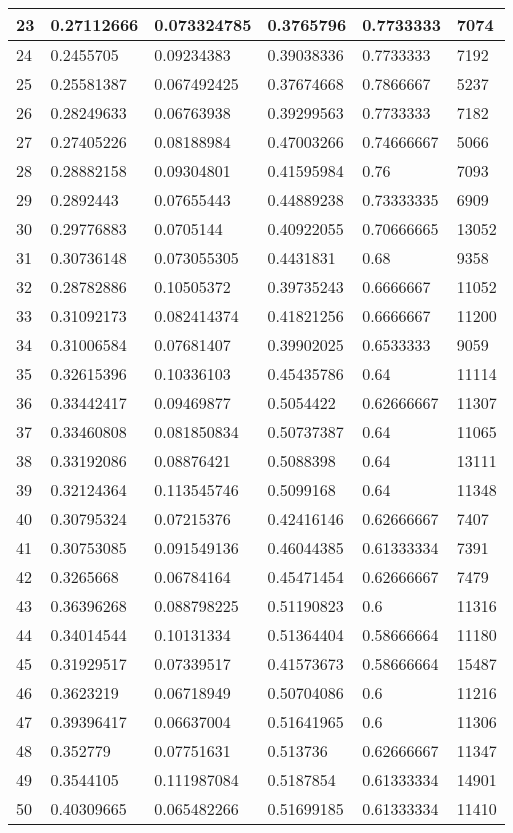 \begin{longtable}{|l|l|l|l|l|l|}
23 & 0.27112666 & 0.073324785 & 0.3765796 & 0.7733333 & 7074 \\ \hline 
24 & 0.2455705 & 0.09234383 & 0.39038336 & 0.7733333 & 7192 \\ \hline 
25 & 0.25581387 & 0.067492425 & 0.37674668 & 0.7866667 & 5237 \\ \hline 
26 & 0.28249633 & 0.06763938 & 0.39299563 & 0.7733333 & 7182 \\ \hline 
27 & 0.27405226 & 0.08188984 & 0.47003266 & 0.74666667 & 5066 \\ \hline 
28 & 0.28882158 & 0.09304801 & 0.41595984 & 0.76 & 7093 \\ \hline 
29 & 0.2892443 & 0.07655443 & 0.44889238 & 0.73333335 & 6909 \\ \hline 
30 & 0.29776883 & 0.0705144 & 0.40922055 & 0.70666665 & 13052 \\ \hline 
31 & 0.30736148 & 0.073055305 & 0.4431831 & 0.68 & 9358 \\ \hline 
32 & 0.28782886 & 0.10505372 & 0.39735243 & 0.6666667 & 11052 \\ \hline 
33 & 0.31092173 & 0.082414374 & 0.41821256 & 0.6666667 & 11200 \\ \hline 
34 & 0.31006584 & 0.07681407 & 0.39902025 & 0.6533333 & 9059 \\ \hline 
35 & 0.32615396 & 0.10336103 & 0.45435786 & 0.64 & 11114 \\ \hline 
36 & 0.33442417 & 0.09469877 & 0.5054422 & 0.62666667 & 11307 \\ \hline 
37 & 0.33460808 & 0.081850834 & 0.50737387 & 0.64 & 11065 \\ \hline 
38 & 0.33192086 & 0.08876421 & 0.5088398 & 0.64 & 13111 \\ \hline 
39 & 0.32124364 & 0.113545746 & 0.5099168 & 0.64 & 11348 \\ \hline 
40 & 0.30795324 & 0.07215376 & 0.42416146 & 0.62666667 & 7407 \\ \hline 
41 & 0.30753085 & 0.091549136 & 0.46044385 & 0.61333334 & 7391 \\ \hline 
42 & 0.3265668 & 0.06784164 & 0.45471454 & 0.62666667 & 7479 \\ \hline 
43 & 0.36396268 & 0.088798225 & 0.51190823 & 0.6 & 11316 \\ \hline 
44 & 0.34014544 & 0.10131334 & 0.51364404 & 0.58666664 & 11180 \\ \hline 
45 & 0.31929517 & 0.07339517 & 0.41573673 & 0.58666664 & 15487 \\ \hline 
46 & 0.3623219 & 0.06718949 & 0.50704086 & 0.6 & 11216 \\ \hline 
47 & 0.39396417 & 0.06637004 & 0.51641965 & 0.6 & 11306 \\ \hline 
48 & 0.352779 & 0.07751631 & 0.513736 & 0.62666667 & 11347 \\ \hline 
49 & 0.3544105 & 0.111987084 & 0.5187854 & 0.61333334 & 14901 \\ \hline 
50 & 0.40309665 & 0.065482266 & 0.51699185 & 0.61333334 & 11410 \\ \hline 
\end{longtable}